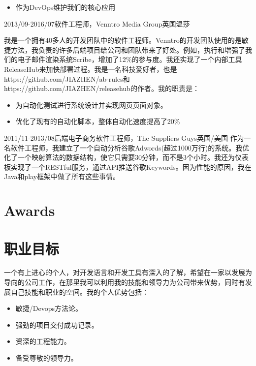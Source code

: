 \documentclass[a4paper]{twentysecondcv-chinese} %
\begin{document}
\begin{twenty}
{\begin{itemize}
              \item 作为DevOps维护我们的核心应用
            \end{itemize}}
    \twentyitem
	    {2013/09-2016/07}{软件工程师，Venntro Media Group}{英国温莎}
    	{我是一个拥有40多人的开发团队中的软件工程师。Venntro的开发团队使用的是敏捷方法，我负责的许多后端项目给公司和团队带来了好处。例如，执行和增强了我们的电子邮件渲染系统Scribe，增加了12\%的参与度。我还实现了一个内部工具ReleaseHub来加快部署过程。我是一名科技爱好者，也是https://github.com/JIAZHEN/ab-rules和https://github.com/JIAZHEN/releasehub的作者。我的职责是：
        	\begin{itemize}
              \item 为自动化测试进行系统设计并实现网页页面对象。
              \item 优化了现有的自动化脚本，整体自动化速度提高了20\%
            \end{itemize}}
    \twentyitem
	    {2011/11-2013/08}{后端电子商务软件工程师，The Suppliers Guys}{英国/美国}
    	{作为一名软件工程师，我建立了一个自动分析谷歌Adwords(超过1000万行)的系统。我优化了一个映射算法的数据结构，使它只需要30分钟，而不是3个小时。我还为仪表板实现了一个RESTful服务，通过API推送谷歌Keywords。因为性能的原因，我在Java和play框架中做了所有这些事情。}
\end{twenty}

\section{Awards}

\begin{twentyshort} %
\end{twentyshort}

\newpage %

\makesidebar

\section{职业目标}

一个有上进心的个人，对开发语言和开发工具有深入的了解，希望在一家以发展为导向的公司工作，在那里我可以利用我的技能和领导力为公司带来优势，同时有发展自己技能和职业的空间。我的个人优势包括：
\begin{itemize}
  \item 敏捷/Devops方法论。
  \item 强劲的项目交付成功记录。
  \item 资深的工程能力。
  \item 备受尊敬的领导力。
\end{itemize}
\end{document}
